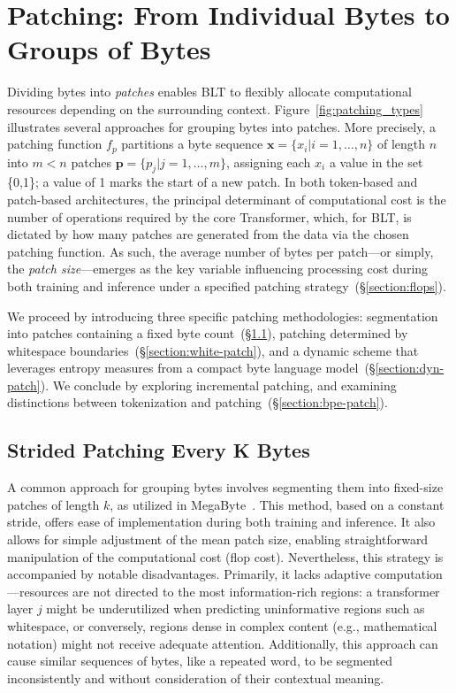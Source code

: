 \section{Patching: From Individual Bytes to Groups of Bytes}
\label{section:patching}

Dividing bytes into \textit{patches} enables {\textsc BLT} to flexibly allocate computational resources depending on the surrounding context. Figure~\ref{fig:patching_types} illustrates several approaches for grouping bytes into patches. More precisely, a patching function $f_p$ partitions a byte sequence $\pmb{x} = \{x_i | i = 1, \ldots, n\}$ of length $n$ into $m < n$ patches $\pmb{p} = \{p_j | j = 1, \ldots, m\}$, assigning each $x_i$ a value in the set \{0,1\}; a value of 1 marks the start of a new patch. In both token-based and patch-based architectures, the principal determinant of computational cost is the number of operations required by the core Transformer, which, for {\textsc BLT}, is dictated by how many patches are generated from the data via the chosen patching function. As such, the average number of bytes per patch—or simply, the \textit{patch size}—emerges as the key variable influencing processing cost during both training and inference under a specified patching strategy~(\S\ref{section:flops}). 

We proceed by introducing three specific patching methodologies: segmentation into patches containing a fixed byte count~(\S\ref{section:static-patch}), patching determined by whitespace boundaries~(\S\ref{section:white-patch}), and a dynamic scheme that leverages entropy measures from a compact byte language model~(\S\ref{section:dyn-patch}). We conclude by exploring incremental patching, and examining distinctions between tokenization and patching~(\S\ref{section:bpe-patch}).

\subsection{Strided Patching Every K Bytes}
\label{section:static-patch}

A common approach for grouping bytes involves segmenting them into fixed-size patches of length $k$, as utilized in MegaByte~\citep{yu2023megabyte}. This method, based on a constant stride, offers ease of implementation during both training and inference. It also allows for simple adjustment of the mean patch size, enabling straightforward manipulation of the computational cost (flop cost). Nevertheless, this strategy is accompanied by notable disadvantages. Primarily, it lacks adaptive computation—resources are not directed to the most information-rich regions: a transformer layer $j$ might be underutilized when predicting uninformative regions such as whitespace, or conversely, regions dense in complex content (e.g., mathematical notation) might not receive adequate attention. Additionally, this approach can cause similar sequences of bytes, like a repeated word, to be segmented inconsistently and without consideration of their contextual meaning.

